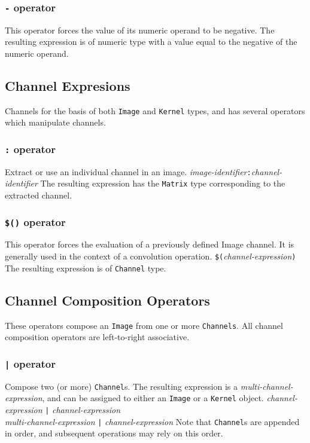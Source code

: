 \subsubsection{\texttt{-} operator}
This operator forces the value of its numeric operand to be negative.
The resulting expression is of numeric type with a value equal to the
negative of the numeric operand.

\subsection{Channel Expresions}
\label{ssec:channelexpressions}
Channels for the basis of both \texttt{Image} and \texttt{Kernel} types, and
\sys{} has several operators which manipulate channels.

\subsubsection{\texttt{:} operator}
\label{sssec:colonop}
Extract or use an individual channel in an image.
\startsyn
\emph{image-identifier}\texttt{:}\emph{channel-identifier}
\stopsyn
The resulting expression has the \texttt{Matrix} type corresponding to the
extracted channel.

\subsubsection{\texttt{\$()} operator}
\label{sssec:evalop}
This operator forces the evaluation of a previously defined Image channel. It
is generally used in the context of a convolution operation.
\startsyn
\texttt{\$(}\emph{channel-expression}\texttt{)}
\stopsyn
The resulting expression is of \texttt{Channel} type.

\subsection{Channel Composition Operators}
\label{ssec:channelops}
These operators compose an \texttt{Image} from one or more \texttt{Channels}.
All channel composition operators are left-to-right associative.

\subsubsection{\texttt{|} operator}
\label{sssec:barop}
Compose two (or more) \texttt{Channel}s. The resulting expression is a
\emph{multi-channel-expression}, and can be assigned to either an \texttt{Image}
or a \texttt{Kernel} object.
\startsyn
\emph{channel-expression} \texttt{|} \emph{channel-expression} \\
\emph{multi-channel-expression} \texttt{|} \emph{channel-expression}
\stopsyn
Note that \texttt{Channel}s are appended in order, and subsequent operations
may rely on this order.

